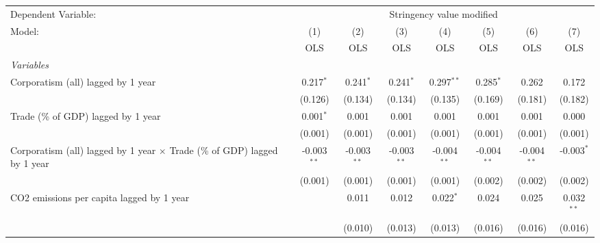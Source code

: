 
\begingroup
\centering
\begin{tabular}{lccccccc}
   \toprule
   Dependent Variable: & \multicolumn{7}{c}{Stringency value modified}\\
   Model:                                                                           & (1)           & (2)           & (3)           & (4)           & (5)           & (6)           & (7)\\  
                                                                                    &  OLS          & OLS           & OLS           & OLS           & OLS           & OLS           & OLS\\  
   \midrule
   \emph{Variables}\\
   Corporatism (all) lagged by 1 year                                               & 0.217$^{*}$   & 0.241$^{*}$   & 0.241$^{*}$   & 0.297$^{**}$  & 0.285$^{*}$   & 0.262         & 0.172\\   
                                                                                    & (0.126)       & (0.134)       & (0.134)       & (0.135)       & (0.169)       & (0.181)       & (0.182)\\   
   Trade (\% of GDP) lagged by 1 year                                               & 0.001$^{*}$   & 0.001         & 0.001         & 0.001         & 0.001         & 0.001         & 0.000\\   
                                                                                    & (0.001)       & (0.001)       & (0.001)       & (0.001)       & (0.001)       & (0.001)       & (0.001)\\   
   Corporatism (all) lagged by 1 year $\times$ Trade (\% of GDP) lagged by 1 year   & -0.003$^{**}$ & -0.003$^{**}$ & -0.003$^{**}$ & -0.004$^{**}$ & -0.004$^{**}$ & -0.004$^{**}$ & -0.003$^{*}$\\   
                                                                                    & (0.001)       & (0.001)       & (0.001)       & (0.001)       & (0.002)       & (0.002)       & (0.002)\\   
   CO2 emissions per capita lagged by 1 year                                        &               & 0.011         & 0.012         & 0.022$^{*}$   & 0.024         & 0.025         & 0.032$^{**}$\\   
                                                                                    &               & (0.010)       & (0.013)       & (0.013)       & (0.016)       & (0.016)       & (0.016)\\   

\end{tabular}
